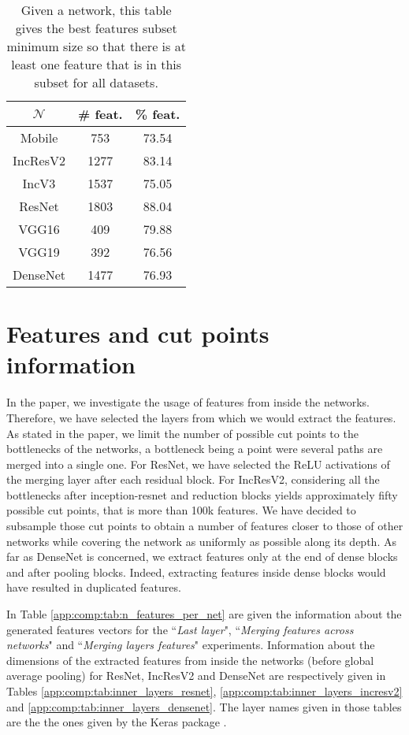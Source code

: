 \begin{table}
\centering
\begin{tabular}{|c|cc|}
\hline
$\mathcal{N}$ & \textbf{\# feat.} & \textbf{\% feat.} \\
\hline
Mobile & 753 & 73.54 \\
IncResV2 & 1277 & 83.14 \\
IncV3 & 1537 & 75.05 \\
ResNet & 1803 & 88.04 \\
VGG16 & 409 & 79.88 \\
VGG19 & 392 & 76.56 \\
DenseNet & 1477 & 76.93 \\
\hline
\end{tabular}
\caption{Given a network, this table gives the best features subset minimum size so that there is at least one feature that is in this subset for all datasets.}
\label{app:comp:tab:best_subset_size}
\end{table}

\section{Features and cut points information}
\label{app:comp:sec:features_and_cut_points}

In the paper, we investigate the usage of features from inside the networks. Therefore, we have selected the layers from which we would extract the features. As stated in the paper, we limit the number of possible cut points to the bottlenecks of the networks, a bottleneck being a point were several paths are merged into a single one. For ResNet, we have selected the ReLU activations of the merging layer after each residual block. 
For IncResV2, considering all the bottlenecks after inception-resnet and reduction blocks yields approximately fifty possible cut points, that is more than 100k features. We have decided to subsample those cut points to obtain a number of features closer to those of other networks while covering the network as uniformly as possible along its depth. As far as DenseNet is concerned, we extract features only at the end of dense blocks and after pooling blocks. Indeed, extracting features inside dense blocks would have resulted in duplicated features.  

In Table \ref{app:comp:tab:n_features_per_net} are given the information about the generated features vectors for the ``\textit{Last layer}", ``\textit{Merging features across networks}" and ``\textit{Merging layers features}" experiments. Information about the dimensions of the extracted features from inside the networks (before global average pooling) for ResNet, IncResV2 and DenseNet are respectively given in Tables \ref{app:comp:tab:inner_layers_resnet}, \ref{app:comp:tab:inner_layers_incresv2} and \ref{app:comp:tab:inner_layers_densenet}. The layer names given in those tables are the the ones given by the Keras package \parencite{chollet2015keras}. 

